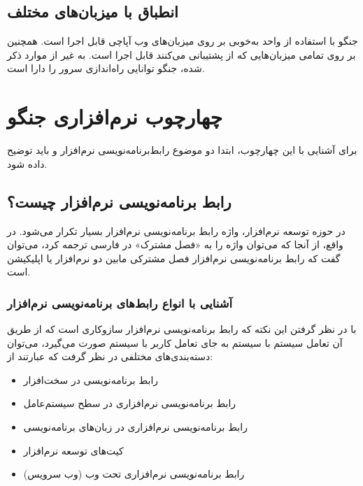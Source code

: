 {\subsection{انطباق با میزبان‌های مختلف}
جنگو با استفاده از واحد  به‌خوبی بر روی میزبان‌های وب آپاچی قابل اجرا است. همچنین بر روی تمامی میزبان‌هایی که از پشتیبانی می‌کنند قابل اجرا است. به غیر از موارد ذکر شده، جنگو توانایی راه‌اندازی سرور  را دارا است.
 
\section{چهارچوب نرم‌افزاری  جنگو}
برای آشنایی با این چهارچوب، ابتدا دو موضوع رابط‌برنامه‌نویسی نرم‌افزار و  باید توضیح داده شود.
 
\subsection{رابط برنامه‌نویسی نرم‌افزار چیست؟}
در حوزه توسعه نرم‌افزار، واژه‌ رابط برنامه‌نویسی نرم‌افزار بسیار تکرار می‌شود. در واقع، از آنجا که می‌توان واژه  را به «فصل مشترک» در فارسی ترجمه کرد، می‌توان گفت که رابط برنامه‌نویسی نرم‌افزار فصل مشترکی مابین دو نرم‌افزار یا اپلیکیشن است.
\subsubsection{آشنایی با انواع رابط‌های برنامه‌نویسی نرم‌افزار}
با در نظر گرفتن این نکته که رابط‌ برنامه‌نویسی نرم‌افزار سازوکاری است که از طریق آن تعامل سیستم با سیستم به جای تعامل کاربر با سیستم صورت می‌گیرد، می‌توان دسته‌بند‌ی‌های مختلفی در نظر گرفت که عبارتند از:

\begin{itemize}
	\item رابط برنامه‌نویسی در سخت‌افزار
	\item رابط برنامه‌نویسی نرم‌افزاری در سطح سیستم‌عامل
	\item رابط برنامه‌نویسی نرم‌افزاری در زبان‌های برنامه‌نویسی
	\item کیت‌های توسعه نرم‌افزار
	\item رابط برنامه‌نویسی نرم‌افزاری تحت وب (وب سرویس)
\end{itemize}
 

}
